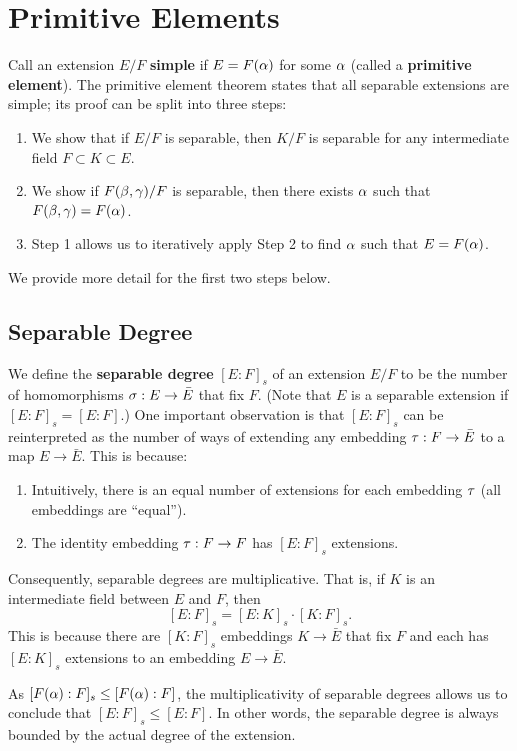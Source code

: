 \section{Primitive Elements}

Call an extension $E/F$ \textbf{simple} if $E = F(\alpha)$ for some $\alpha$ (called a \textbf{primitive element}). The primitive element theorem states that all separable extensions are simple; its proof can be split into three steps:
\begin{enumerate}
    \item We show that if $E/F$ is separable, then $K/F$ is separable for any intermediate field $F \subset K \subset E$.
    \item We show if $F(\beta, \gamma)/F$ is separable, then there exists $\alpha$ such that $F(\beta, \gamma) = F(\alpha)$.
    \item Step 1 allows us to iteratively apply Step 2 to find $\alpha$ such that $E = F(\alpha)$.
\end{enumerate}

We provide more detail for the first two steps below.

\subsection{Separable Degree}
We define the \textbf{separable degree} $[E:F]_s$ of an extension $E/F$ to be the number of homomorphisms $\sigma: E \to \bar{E}$ that fix $F$. (Note that $E$ is a separable extension if $[E:F]_s = [E:F]$.) One important observation is that $[E:F]_s$ can be reinterpreted as the number of ways of extending any embedding $\tau: F \to \bar{E}$ to a map $E \to \bar{E}$. This is because:
\begin{enumerate}
    \item Intuitively, there is an equal number of extensions for each embedding $\tau$ (all embeddings are ``equal'').
    \item The identity embedding $\tau: F \to F$ has $[E:F]_s$ extensions.
\end{enumerate}

Consequently, separable degrees are multiplicative. That is, if $K$ is an intermediate field between $E$ and $F$, then
\[
    [E:F]_s = [E:K]_s \cdot [K:F]_s.
\]
This is because there are $[K:F]_s$ embeddings $K \to \bar{E}$ that fix $F$ and each has $[E:K]_s$ extensions to an embedding $E \to \bar{E}$.

As $[F(\alpha):F]_s \leq [F(\alpha):F]$, the multiplicativity of separable degrees allows us to conclude that $[E:F]_s \leq [E:F]$. In other words, the separable degree is always bounded by the actual degree of the extension.

